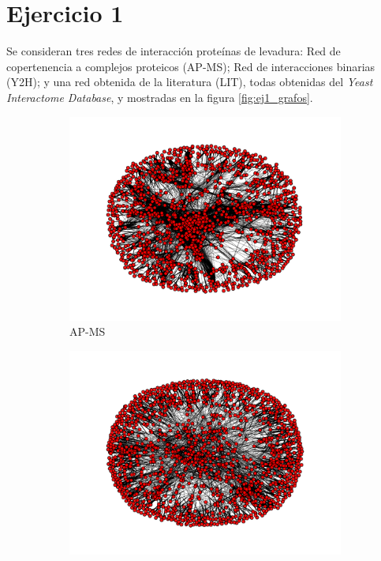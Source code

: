 
\section{Ejercicio 1}

Se consideran tres redes de interacci\'on prote\'inas de levadura: Red de 
copertenencia a complejos proteicos (AP-MS); Red de interacciones binarias 
(Y2H); y una red obtenida de la literatura (LIT), todas obtenidas del 
\textit{Yeast Interactome Database}, y mostradas en la figura \ref{fig:ej1_grafos}.

\begin{figure}[!ht]
    \centering
    \begin{subfigure}[b]{0.40\columnwidth}
        \includegraphics[width=\textwidth]{./schemes/yeast_AP-MS.pdf}
        \caption{\label{fig:ap_ms} AP-MS}
    \end{subfigure}
    \begin{subfigure}[b]{0.40\columnwidth}
        \includegraphics[width=\textwidth]{./schemes/yeast_LIT.pdf}

\end{subfigure}
\end{figure}
